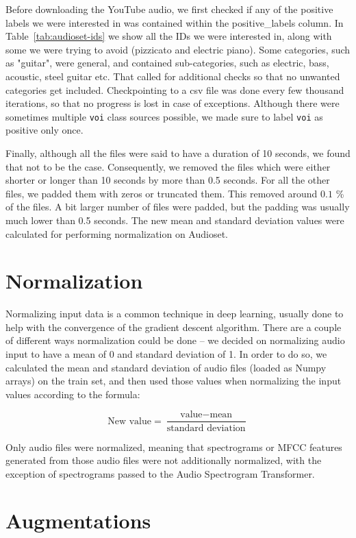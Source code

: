 Before downloading the YouTube audio, we first checked if any of the positive labels we were interested in was contained within the positive\_labels column. In Table~\ref{tab:audioset-ids} we show all the IDs we were interested in, along with some we were trying to avoid (pizzicato and electric piano). Some categories, such as "guitar", were general, and contained sub-categories, such as electric, bass, acoustic, steel guitar etc. That called for additional checks so that no unwanted categories get included. Checkpointing to a csv file was done every few thousand iterations, so that no progress is lost in case of exceptions. Although there were sometimes multiple \texttt{voi} class sources possible, we made sure to label \texttt{voi} as positive only once. 

Finally, although all the files were said to have a duration of 10 seconds, we found that not to be the case. Consequently, we removed the files which were either shorter or longer than 10 seconds by more than 0.5 seconds. For all the other files, we padded them with zeros or truncated them. This removed around $0.1$ \% of the files. A bit larger number of files were padded, but the padding was usually much lower than 0.5 seconds. The new mean and standard deviation values were calculated for performing normalization on Audioset.

\section{Normalization}

Normalizing input data is a common technique in deep learning, usually done to help with the convergence of the gradient descent algorithm. There are a couple of different ways normalization could be done -- we decided on normalizing audio input to have a mean of 0 and standard deviation of 1. In order to do so, we calculated the mean and standard deviation of audio files (loaded as Numpy arrays) on the train set, and then used those values when normalizing the input values according to the formula:

\[ \text{{New value}} = \frac{{\text{{value}} - \text{{mean}}}}{{\text{{standard deviation}}}} \]

Only audio files were normalized, meaning that spectrograms or MFCC features generated from those audio files were not additionally normalized, with the exception of spectrograms passed to the Audio Spectrogram Transformer.

\section{Augmentations}


